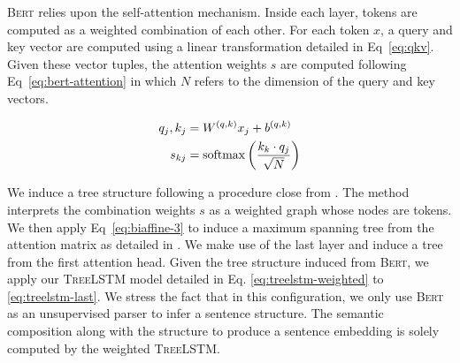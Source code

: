 \textsc{Bert} relies upon the self-attention mechanism. Inside each layer, tokens are computed as a weighted combination of each other. For each token $x$, a query and key vector are computed using a linear transformation detailed in Eq~\ref{eq:qkv}. Given these vector tuples, the attention weights $s$ are computed following Eq~\ref{eq:bert-attention} in which $N$ refers to the dimension of the query and key vectors.

\begin{align}
    q_j, k_j &= W^{(q, k)} x_j + b^{(q, k)} \label{eq:qkv}\\
    s_{kj} &= \operatorname{softmax}\left(\frac{k_{k} \cdot q_{j}}{\sqrt{N}}\right) \label{eq:bert-attention}
\end{align}

We induce a tree structure following a procedure close from \textcite{ravishankar_21}. The method interprets the combination weights $s$ as a weighted graph whose nodes are tokens. We then apply Eq~\ref{eq:biaffine-3} to induce a maximum spanning tree from the attention matrix as detailed in . We make use of the last layer and induce a tree from the first attention head. Given the tree structure induced from \textsc{Bert}, we apply our \textsc{TreeLSTM} model detailed in Eq. \ref{eq:treelstm-weighted} to \ref{eq:treelstm-last}. We stress the fact that in this configuration, we only use \textsc{Bert} as an unsupervised parser to infer a sentence structure. The semantic composition along with the structure to produce a sentence embedding is solely computed by the weighted \textsc{TreeLSTM}.

